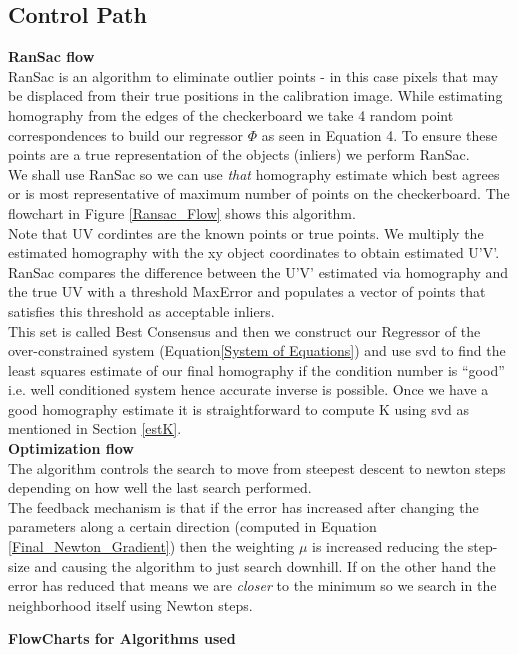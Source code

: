 \documentclass[titlepage]{article}
\begin{document}
\subsection{Control Path}
\textbf{RanSac flow}\\
RanSac is an algorithm to eliminate outlier points - in this case pixels that may be displaced from their true positions in the calibration image. While estimating homography from the edges of the checkerboard we take 4 random point correspondences to build our regressor $\Phi$ as seen in Equation 4. To ensure these points are a true representation of the objects (inliers) we perform RanSac.\\
%
We shall use RanSac so we can use \textit{that} homography estimate which best agrees or is most representative of maximum number of points on the checkerboard. The flowchart in Figure \ref{Ransac_Flow} shows this algorithm.\\
Note that UV cordintes are the known points or true points. We multiply the estimated homography with the xy object coordinates to obtain estimated U’V’. RanSac compares the difference between the U’V’ estimated via homography and the true UV with a threshold MaxError and populates a vector of points that satisfies this threshold as acceptable inliers. \\
This set is called Best Consensus and then we construct our Regressor of the over-constrained system (Equation\ref{System of Equations}) and use svd to find the least squares estimate of our final homography if the condition number is “good” i.e.
well conditioned system hence accurate inverse is possible. Once we have a good homography estimate it is straightforward to compute K using svd as mentioned in Section \ref{estK}.\\
\textbf{Optimization flow}\\
The algorithm controls the search to move from steepest descent to newton steps depending on how well the last search performed. \\
The feedback mechanism is that if the error has increased after changing the parameters along a certain direction (computed in Equation \ref{Final_Newton_Gradient}) then the weighting $\mu$ is increased reducing the step-size and causing the algorithm to just search downhill. If on the other hand the error has reduced that means we are \textit{closer} to the minimum so we search in the neighborhood itself using Newton steps.\\
\begin{center}
\textbf{FlowCharts for Algorithms used}\\
\end{center}
\end{document}
